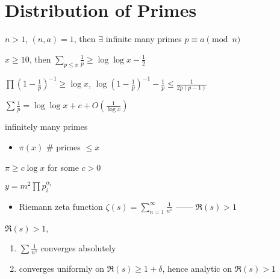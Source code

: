 \section{Distribution of Primes}\label{sec:distribution-of-primes}

\begin{thm}
    $n > 1$, $(n, a) = 1$, then $\exists$ infinite many primes $p \equiv a \pmod{n}$
\end{thm}

\begin{prop}
    $x \geq 10$, then $\sum_{p \leq x} \frac{1}{p} \geq \log \log x - \frac{1}{2}$
\end{prop}
\begin{pf}
    $\prod (1 - \frac{1}{p})^{-1} \geq \log x$, $\log(1 - \frac{1}{p})^{-1} - \frac{1}{p} \leq \frac{1}{2p(p-1)}$
\end{pf}

\begin{fact}
    $\sum \frac{1}{p} = \log \log x + c + O(\frac{1}{\log x})$
\end{fact}

\begin{cor}
    infinitely many primes
\end{cor}

\begin{itemize}
    \item $\pi(x)$ \dash $\#$ primes $\leq x$
\end{itemize}

\begin{prop}
    $\pi \geq c \log x$ for some $c > 0$
\end{prop}
\begin{pf}
    $y = m^{2}\prod p_i^{\alpha_i}$
\end{pf}

\begin{itemize}
    \item Riemann zeta function $\zeta(s) = \sum_{n=1}^\infty \frac{1}{n^s}$ ------ $\Re(s) > 1$
\end{itemize}

\begin{lemma}
    $\Re(s) > 1$,
    \begin{enumerate}
        \item $\sum \frac{1}{n^s}$ converges absolutely
        \item converges uniformly on $\Re(s) \geq 1 + \delta$, hence analytic on $\Re(s) > 1$
    \end{enumerate}
\end{lemma}

